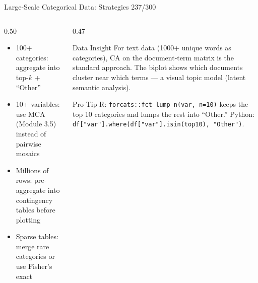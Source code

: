 \documentclass[10pt]{beamer}
\newcommand{\smark}[1]{\hfill{\scriptsize\color{codegray}#1}}
\begin{document}
\begin{frame}{Large-Scale Categorical Data: Strategies}
\smark{237/300}
\begin{columns}[T]
\begin{column}{0.50\textwidth}
\begin{itemize}
    \item 100+ categories: aggregate into top-$k$ + ``Other''
    \item 10+ variables: use MCA (Module 3.5) instead of pairwise mosaics
    \item Millions of rows: pre-aggregate into contingency tables before plotting
    \item Sparse tables: merge rare categories or use Fisher's exact
\end{itemize}
\end{column}
\begin{column}{0.47\textwidth}
\begin{exampleblock}{Data Insight}
    \scriptsize For text data (1000+ unique words as categories), CA on the document-term matrix is the standard approach. The biplot shows which documents cluster near which terms --- a visual topic model (latent semantic analysis).
\end{exampleblock}
\vspace{0.1cm}
\begin{alertblock}{Pro-Tip}
    \scriptsize R: \texttt{forcats::fct\_lump\_n(var, n=10)} keeps the top 10 categories and lumps the rest into ``Other.'' Python: \texttt{df["var"].where(df["var"].isin(top10), "Other")}.
\end{alertblock}
\end{column}
\end{columns}
\end{frame}
\end{document}
